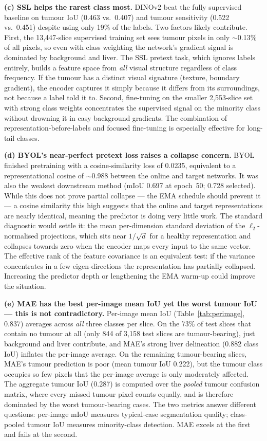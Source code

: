 \documentclass[conference]{IEEEtran}
\begin{document}
\textbf{(c) SSL helps the rarest class most.}
DINOv2 beat the fully supervised baseline on tumour IoU (0.463 vs.\ 0.407)
and tumour sensitivity (0.522 vs.\ 0.451) despite using only 19\% of the
labels. Two factors likely contribute. First, the 13{,}447-slice supervised
training set sees tumour pixels in only $\sim$0.13\% of all pixels, so even
with class weighting the network's gradient signal is dominated by
background and liver. The SSL pretext task, which ignores labels entirely,
builds a feature space from \emph{all} visual structure regardless of class
frequency. If the tumour has a distinct visual signature (texture, boundary
gradient), the encoder captures it simply because it differs from its
surroundings, not because a label told it to. Second, fine-tuning on the
smaller 2{,}553-slice set with strong class weights concentrates the
supervised signal on the minority class without drowning it in easy
background gradients. The combination of representation-before-labels and
focused fine-tuning is especially effective for long-tail classes.

\textbf{(d) BYOL's near-perfect pretext loss raises a collapse concern.}
BYOL finished pretraining with a cosine-similarity loss of 0.0235,
equivalent to a representational cosine of $\sim$0.988 between the online
and target networks. It was also the weakest downstream method (mIoU
0.697 at epoch~50; 0.728 selected). While this does not prove partial
collapse --- the EMA schedule should prevent it --- a cosine similarity
this high suggests that the online and target representations are nearly
identical, meaning the predictor is doing very little work. The standard
diagnostic would settle it: the mean per-dimension standard deviation of
the $\ell_2$-normalised projections, which sits near $1/\sqrt{d}$ for a
healthy representation and collapses towards zero when the encoder maps
every input to the same vector. The effective rank of the feature
covariance is an equivalent test: if the variance concentrates in a few
eigen-directions the representation has partially collapsed. Increasing
the predictor depth or lengthening the EMA warm-up could improve the
situation.

\textbf{(e) MAE has the best per-image mean IoU yet the worst tumour IoU ---
this is not contradictory.}
Per-image mean IoU (Table~\ref{tab:perimage}, 0.837) averages across
\emph{all} three classes per slice. On the 73\% of test slices that contain
no tumour at all (only 844 of 3{,}158 test slices are tumour-bearing), just
background and liver contribute, and MAE's strong liver delineation (0.882
class IoU) inflates the per-image average. On the remaining tumour-bearing
slices, MAE's tumour prediction is poor (mean tumour IoU 0.222), but the
tumour class occupies so few pixels that the per-image average is only
moderately affected. The aggregate tumour IoU (0.287) is computed over the
\emph{pooled} tumour confusion matrix, where every missed tumour pixel
counts equally, and is therefore dominated by the worst tumour-bearing
cases. The two metrics answer different questions: per-image mIoU measures
typical-case segmentation quality; class-pooled tumour IoU measures
minority-class detection. MAE excels at the first and fails at the second.
\end{document}
